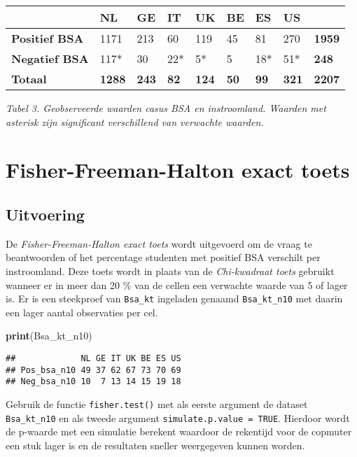 \documentclass[
]{article}
\newenvironment{Shaded}{\begin{snugshade}}{\end{snugshade}}
\newcommand{\KeywordTok}[1]{\textcolor[rgb]{0.13,0.29,0.53}{\textbf{#1}}}
\newcommand{\NormalTok}[1]{#1}
\begin{document}
\begin{longtable}[]{@{}lllllllll@{}}
\toprule
& NL & GE & IT & UK & BE & ES & US &\tabularnewline
\midrule
\endhead
\textbf{Positief BSA} & 1171 & 213 & 60 & 119 & 45 & 81 & 270 &
\textbf{1959}\tabularnewline
\textbf{Negatief BSA} & 117* & 30 & 22* & 5* & 5 & 18* & 51* &
\textbf{248}\tabularnewline
\textbf{Totaal} & \textbf{1288} & \textbf{243} & \textbf{82} &
\textbf{124} & \textbf{50} & \textbf{99} & \textbf{321} &
\textbf{2207}\tabularnewline
\bottomrule
\end{longtable}

\emph{Tabel 3. Geobserveerde waarden casus BSA en instroomland. Waarden
met asterisk zijn significant verschillend van verwachte waarden.}

\hypertarget{fisher-freeman-halton-exact-toets}{%
\section{Fisher-Freeman-Halton exact
toets}\label{fisher-freeman-halton-exact-toets}}

\hypertarget{uitvoering-1}{%
\subsection{Uitvoering}\label{uitvoering-1}}

De \emph{Fisher-Freeman-Halton exact toets} wordt uitgevoerd om de vraag
te beantwoorden of het percentage studenten met positief BSA verschilt
per instroomland. Deze toets wordt in plaats van de \emph{Chi-kwadraat
toets} gebruikt wanneer er in meer dan 20 \% van de cellen een verwachte
waarde van 5 of lager is. Er is een steekproef van \texttt{Bsa\_kt}
ingeladen genaamd \texttt{Bsa\_kt\_n10} met daarin een lager aantal
observaties per cel.

\begin{Shaded}
\begin{Highlighting}[]
\KeywordTok{print}\NormalTok{(Bsa_kt_n10)}
\end{Highlighting}
\end{Shaded}

\begin{verbatim}
##             NL GE IT UK BE ES US
## Pos_bsa_n10 49 37 62 67 73 70 69
## Neg_bsa_n10 10  7 13 14 15 19 18
\end{verbatim}

Gebruik de functie \texttt{fisher.test()} met als eerste argument de
dataset \texttt{Bsa\_kt\_n10} en als tweede argument
\texttt{simulate.p.value\ =\ TRUE}. Hierdoor wordt de p-waarde met een
simulatie berekent waardoor de rekentijd voor de copmuter een stuk lager
is en de resultaten sneller weergegeven kunnen worden.
\end{document}

